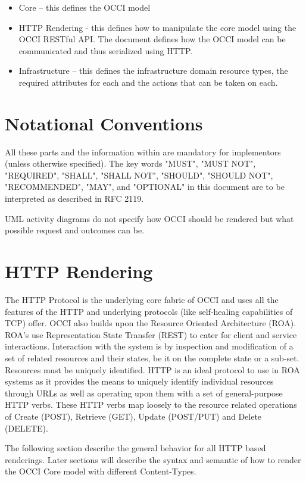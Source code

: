 \documentclass[10pt,a4paper]{article}
\begin{document}
\begin{itemize}
\item Core – this defines the OCCI model
\item HTTP Rendering - this defines how to manipulate the core model using the OCCI RESTful API. The document defines how the OCCI model can be communicated and thus serialized using HTTP.
\item Infrastructure – this defines the infrastructure domain resource types, the required attributes for each and the actions that can be taken on each.
\end{itemize}

\section{Notational Conventions}

All these parts and the information within are mandatory for implementors (unless otherwise specified). The key words "MUST", "MUST NOT", "REQUIRED", "SHALL", "SHALL NOT", "SHOULD", "SHOULD NOT", "RECOMMENDED", "MAY", and "OPTIONAL" in this document are to be interpreted as described in RFC 2119. 

UML activity diagrams do not specify how OCCI should be rendered but what possible request and outcomes can be.

\section{HTTP Rendering}
The HTTP Protocol is the underlying core fabric of OCCI and uses all the features of the HTTP and underlying protocols (like self-healing capabilities of TCP) offer. OCCI also builds upon the Resource Oriented Architecture (ROA). ROA's use Representation State Transfer (REST) to cater for client and service interactions. Interaction with the system is by inspection and modification of a set of related resources and their states, be it on the complete state or a sub-set. Resources must be uniquely identified. HTTP is an ideal protocol to use in ROA systems as it provides the means to uniquely identify individual resources through URLs as well as operating upon them with a set of general-purpose HTTP verbs. These HTTP verbs map loosely to the resource related operations of Create (POST), Retrieve (GET), Update (POST/PUT) and Delete (DELETE).

The following section describe the general behavior for all HTTP based renderings. Later sections will describe the syntax and semantic of how to render the OCCI Core model with different Content-Types.
\end{document}
